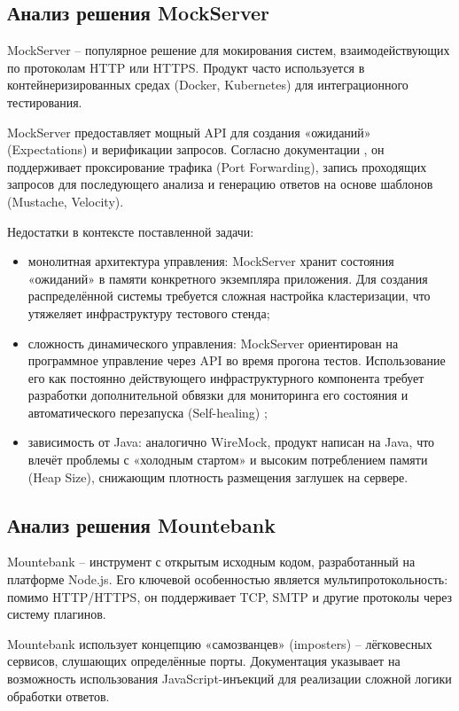 \subsection{Анализ решения MockServer}

MockServer -- популярное решение для мокирования систем, взаимодействующих по протоколам HTTP или HTTPS. Продукт часто используется в контейнеризированных средах (Docker, Kubernetes) для интеграционного тестирования.

MockServer предоставляет мощный API для создания «ожиданий» (Expectations) и верификации запросов. Согласно документации \cite{mockserver}, он поддерживает проксирование трафика (Port Forwarding), запись проходящих запросов для последующего анализа и генерацию ответов на основе шаблонов (Mustache, Velocity).

Недостатки в контексте поставленной задачи:

\begin{itemize}
\item монолитная архитектура управления: MockServer хранит состояния «ожиданий» в памяти конкретного экземпляра приложения. Для создания распределённой системы требуется сложная настройка кластеризации, что утяжеляет инфраструктуру тестового стенда;
\item сложность динамического управления: MockServer ориентирован на программное управление через API во время прогона тестов. Использование его как постоянно действующего инфраструктурного компонента требует разработки дополнительной обвязки для мониторинга его состояния и автоматического перезапуска (Self-healing) \cite{mockserver};
\item зависимость от Java: аналогично WireMock, продукт написан на Java, что влечёт проблемы с «холодным стартом» и высоким потреблением памяти (Heap Size), снижающим плотность размещения заглушек на сервере.
\end{itemize}

\subsection{Анализ решения Mountebank}

Mountebank -- инструмент с открытым исходным кодом, разработанный на платформе Node.js. Его ключевой особенностью является мультипротокольность: помимо HTTP/HTTPS, он поддерживает TCP, SMTP и другие протоколы через систему плагинов.

Mountebank использует концепцию «самозванцев» (imposters) -- лёгковесных сервисов, слушающих определённые порты. Документация \cite{mountebank} указывает на возможность использования JavaScript-инъекций для реализации сложной логики обработки ответов.

